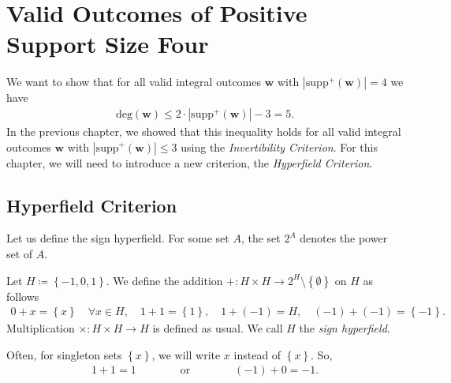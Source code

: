 
\chapter{Valid Outcomes of Positive Support Size Four}

We want to show that for all valid integral outcomes \( \mathbf w \) with \( |\mathrm{supp}^+(\mathbf w)| = 4 \) we have
\begin{align*}
    \mathrm{deg}(\mathbf w) \leq 2 \cdot |\mathrm{supp}^+(\mathbf w)| - 3 = 5.
\end{align*}
In the previous chapter, we showed that this inequality holds for all valid integral outcomes \( \mathbf w \) with \( |\mathrm{supp}^+(\mathbf w)| \leq 3 \) using the \emph{Invertibility Criterion}. For this chapter, we will need to introduce a new criterion, the \emph{Hyperfield Criterion}.

\section{Hyperfield Criterion}

Let us define the {sign hyperfield}. For some set \( A \), the set \( 2^A \) denotes the power set of \( A \).

\begin{definition}
    Let \( H \coloneqq \left\{ -1, 0, 1 \right\} \). We define the addition \( + : H \times H \to 2^H \setminus \left\{ \emptyset \right\} \) on \( H \) as follows
    \begin{align*}
        0 + x = \left\{ x \right\}  \quad \forall x \in H, \quad 1 + 1 = \left\{ 1 \right\}, \quad 1 + (-1) = H, \quad (-1) + (-1) = \left\{ -1 \right\}.
    \end{align*}
    Multiplication \( \times : H \times H \to H \) is defined as usual. We call \( H \) the \emph{sign hyperfield}.
\end{definition}

Often, for singleton sets \( \left\{ x \right\} \), we will write \( x \) instead of \( \left\{ x \right\} \). So, 
\begin{align*}
    1 + 1 = 1 \qquad \qquad \text{or} \qquad \qquad (-1) + 0 = -1.
\end{align*}

